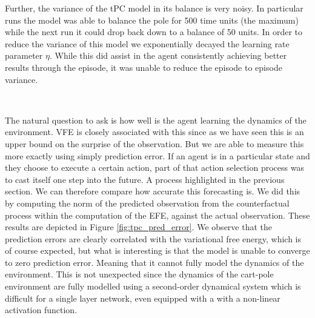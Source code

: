 \documentclass{article}
\begin{document}
Further, the variance of the tPC model in its balance is very noisy. In particular runs the model was able to balance the pole for 500 time units (the maximum) while the next run it could drop back down to a balance of 50 units. In order to reduce the variance of this model we exponentially decayed the learning rate parameter $\eta$. While this did assist in the agent consistently achieving better results through the episode, it was unable to reduce the episode to episode variance. 

\

The natural question to ask is how well is the agent learning the dynamics of the environment. VFE is closely associated with this since as we have seen this is an upper bound on the surprise of the observation. But we are able to measure this more exactly using simply prediction error. If an agent is in a particular state and they choose to execute a certain action, part of that action selection process was to cast itself one step into the future. A process highlighted in the previous section. We can therefore compare how accurate this forecasting is. We did this by computing the norm of the predicted observation from the counterfactual process within the computation of the EFE, against the actual observation. These results are depicted in Figure \ref{fig:tpc_pred_error}. We observe that the prediction errors are clearly correlated with the variational free energy, which is of course expected, but what is interesting is that the model is unable to converge to zero prediction error. Meaning that it cannot fully model the dynamics of the environment. This is not unexpected since the dynamics of the cart-pole environment are fully modelled using a second-order dynamical system \citep{florian2005CorrectEF} which is difficult for a single layer network, even equipped with a with a non-linear activation function. 
\end{document}
